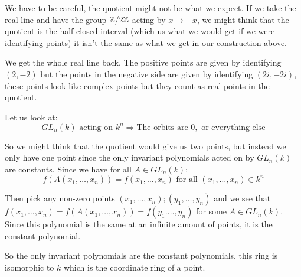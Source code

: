 \begin{remark}
    We have to be careful, the quotient might not be what we expect. If we take the real line and have the group $\mathbb{Z}/2\mathbb{Z}$ acting by $x\rightarrow -x$, we might think that the quotient is the half closed interval (which us what we would get if we were identifying points) it isn't the same as what we get in our construction above.

    We get the whole real line back. The positive points are given by identifying $(2,-2)$ but the points in the negative side are given by identifying $(2i,-2i)$, these points look like complex points but they count as real points in the quotient.
\end{remark}

\begin{example}
    Let us look at:\begin{equation}
        GL_n(k)\text{ acting on }k^n \Rightarrow \text{The orbits are }0, \text{ or everything else}
    \end{equation}

    So we might think that the quotient would give us two points, but instead we only have one point since the only invariant polynomials acted on by $GL_n(k)$ are constants. Since we have for all $A\in GL_n(k):$ \[f(A(x_1,\dots,x_n)) = f(x_1,\dots,x_n)\text{ for all }(x_1,\dots,x_n)\in k^n\] 


Then pick any non-zero points $(x_1,\dots,x_n); (y_1,\dots,y_n)$ and we see that $f(x_1,\dots,x_n) = f(A(x_1,\dots,x_n)) = f(y_1.\dots,y_n)$ for some $A\in GL_n(k)$. Since this polynomial is the same at an infinite amount of points, it is the constant polynomial.

So the only invariant polynomials are the constant polynomials, this ring is isomorphic to $k$ which is the coordinate ring of a point.
\end{example}

